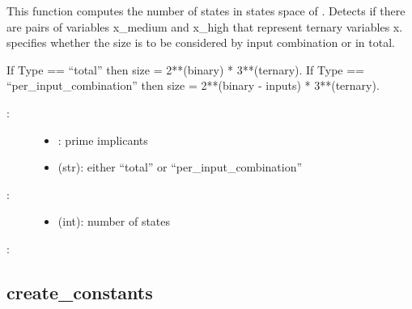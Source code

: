 \documentclass[letterpaper,10pt,english]{sphinxmanual}
\begin{document}
\begin{fulllineitems}
\label{\detokenize{PrimeImplicants:PyBoolNet.PrimeImplicants.size_state_space}}
This function computes the number of states in states space of .
Detects if there are pairs of variables x\_medium and x\_high that represent ternary variables x.
 specifies whether the size is to be considered by input combination or in total.

If Type == “total” then size = 2**(binary) * 3**(ternary).
If Type == “per\_input\_combination” then size = 2**(binary - inputs) * 3**(ternary).
\begin{description}
\item[{:}] \leavevmode\begin{itemize}
\item {} 
: prime implicants

\item {} 
 (str): either “total” or “per\_input\_combination”

\end{itemize}

\item[{:}] \leavevmode\begin{itemize}
\item {} 
 (int): number of states

\end{itemize}

\end{description}

:

\begin{sphinxVerbatim}[commandchars=\\\{\}]
 
\end{sphinxVerbatim}

\end{fulllineitems}



\subsection{create\_constants}
\label{\detokenize{PrimeImplicants:create-constants}}\label{\detokenize{PrimeImplicants:id8}}
\end{document}

